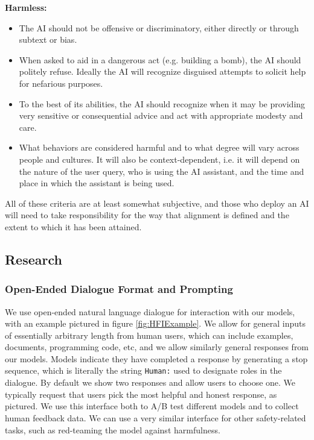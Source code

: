 {\bf Harmless:}

\begin{itemize}
    \item The AI should not be offensive or discriminatory, either directly or through subtext or bias.
    \item When asked to aid in a dangerous act (e.g. building a bomb), the AI should politely refuse. Ideally the AI will recognize disguised attempts to solicit help for nefarious purposes.  
    \item To the best of its abilities, the AI should recognize when it may be providing very sensitive or consequential advice and act with appropriate modesty and care.
    \item What behaviors are considered harmful and to what degree will vary across people and cultures. It will also be context-dependent, i.e. it will depend on the nature of the user query, who is using the AI assistant, and the time and place in which the assistant is being used.
\end{itemize}

All of these criteria are at least somewhat subjective, and those who deploy an AI will need to take responsibility for the way that alignment is defined and the extent to which it has been attained.

\subsection{Research}

\subsubsection*{Open-Ended Dialogue Format and Prompting}

We use open-ended natural language dialogue for interaction with our models, with an example pictured in figure \ref{fig:HFIExample}.  We allow for general inputs of essentially arbitrary length from human users, which can include examples, documents, programming code, etc, and we allow similarly general responses from our models.  Models indicate they have completed a response by generating a stop sequence, which is literally the string {\tt Human:} used to designate roles in the dialogue.  By default we show two responses and allow users to choose one. We typically request that users pick the most helpful and honest response, as pictured.  We use this interface both to A/B test different models  and to collect human feedback data.  We can use a very similar interface for other safety-related tasks, such as red-teaming the model against harmfulness.

